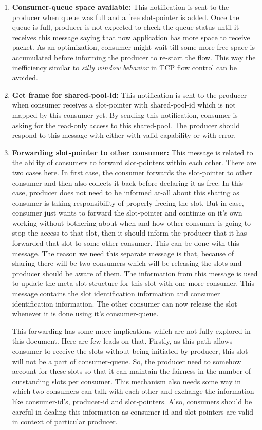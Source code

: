 \documentclass[a4paper,twoside]{report} %
\begin{document}
\begin{enumerate} 
  \item \textbf{Consumer-queue space available:} This notification is
  sent to the producer when queue was full and a free slot-pointer is
  added.  Once the queue is full, producer is not expected to check
  the queue status until it receives this message saying that now
  application has more space to receive packet.  As an optimization,
  consumer might wait till some more free-space is accumulated before
  informing the producer to re-start the flow.  This way the
  inefficiency similar to \textit{silly window behavior} in TCP 
  flow control can be avoided.

  \item \textbf{Get frame for shared-pool-id:} This notification is
  sent to the producer when consumer receives a slot-pointer with 
  shared-pool-id which is not mapped by this consumer yet.  By
  sending this notification, consumer is asking for the read-only
  access to this shared-pool.  The producer should respond to
  this message with either with valid capability or with error.

  \item \textbf{Forwarding slot-pointer to other consumer:}  This
  message is related to the ability of consumers to forward
  slot-pointers within each other.  There are two cases here.  In
  first case, the consumer forwards the slot-pointer to other 
  consumer and then also collects it back before declaring it as free.
  In this case, producer does not need to be informed at-all about
  this sharing as consumer is taking responsibility of properly
  freeing the slot.  But in case, consumer just wants to forward the
  slot-pointer and continue on it's own working without bothering
  about when and how other consumer is going to stop the access to
  that slot, then it should inform the producer that it has forwarded
  that slot to some other consumer.  This can be done with this
  message.  The reason we need this separate message is that, 
  because of sharing there will be two consumers which will be 
  releasing the slots and producer should be aware of them.  
  The information from this message is used to update the 
  meta-slot structure for this slot with one more consumer.
  This message contains the slot identification information
  and consumer identification information.  The other consumer can 
  now release the slot whenever it is done using it's consumer-queue.  


  This forwarding has some more implications which are not fully
  explored in this document.  Here are few leads on that.  Firstly,
  as this path allows consumer to receive the slots without being
  initiated by producer, this slot will not be a part of
  consumer-queue.  So, the producer need to somehow account for these
  slots so that it can maintain the fairness in the number of
  outstanding slots per consumer.  This mechanism also needs some way
  in which two consumers can talk with each other and exchange the 
  information like consumer-id's, producer-id and slot-pointers.
  Also, consumers should be careful in dealing this information as
  consumer-id and slot-pointers are valid in context of particular
  producer.
\end{enumerate} 
\end{document}

